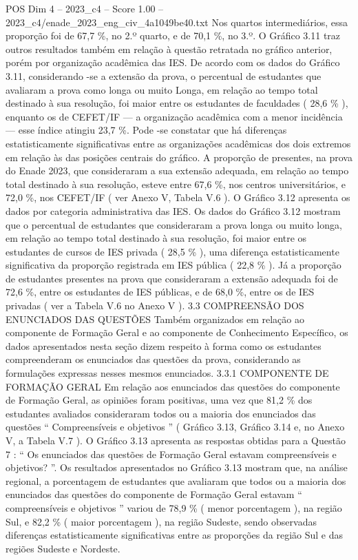 \begin{textsample}{POS Dim 4 – 2023\_c4 – Score 1.00 – 2023\_c4/enade\_2023\_eng\_civ\_4a1049be40.txt}
Nos quartos intermediários, essa proporção foi de 67,7 \%, no 2.º quarto, e de 70,1 \%, no 3.º.
O Gráfico 3.11 traz outros resultados também em relação à questão retratada no gráfico anterior, porém por organização acadêmica das IES.
De acordo com os dados do Gráfico 3.11, considerando -se a extensão da prova, o percentual de estudantes que avaliaram a prova como longa ou muito Longa, em relação ao tempo total destinado à sua resolução, foi maior entre os estudantes de faculdades ( 28,6 \% ), enquanto os de CEFET/IF — a organização acadêmica com a menor incidência — esse índice atingiu 23,7 \%.
Pode -se constatar que há diferenças estatisticamente significativas entre as organizações acadêmicas dos dois extremos em relação às das posições centrais do gráfico.
A proporção de presentes, na prova do Enade 2023, que consideraram a sua extensão adequada, em relação ao tempo total destinado à sua resolução, esteve entre 67,6 \%, nos centros universitários, e 72,0 \%, nos CEFET/IF ( ver Anexo V, Tabela V.6 ).
O Gráfico 3.12 apresenta os dados por categoria administrativa das IES.
Os dados do Gráfico 3.12 mostram que o percentual de estudantes que consideraram a prova longa ou muito longa, em relação ao tempo total destinado à sua resolução, foi maior entre os estudantes de cursos de IES privada ( 28,5 \% ), uma diferença estatisticamente significativa da proporção registrada em IES pública ( 22,8 \% ).
Já a proporção de estudantes presentes na prova que consideraram a extensão adequada foi de 72,6 \%, entre os estudantes de IES públicas, e de 68,0 \%, entre os de IES privadas ( ver a Tabela V.6 no Anexo V ). 3.3 COMPREENSÃO DOS ENUNCIADOS DAS QUESTÕES Também organizados em relação ao componente de Formação Geral e ao componente de Conhecimento Específico, os dados apresentados nesta seção dizem respeito à forma como os estudantes compreenderam os enunciados das questões da prova, considerando as formulações expressas nesses mesmos enunciados. 3.3.1 COMPONENTE DE FORMAÇÃO GERAL Em relação aos enunciados das questões do componente de Formação Geral, as opiniões foram positivas, uma vez que 81,2 \% dos estudantes avaliados consideraram todos ou a maioria dos enunciados das questões “ Compreensíveis e objetivos ” ( Gráfico 3.13, Gráfico 3.14 e, no Anexo V, a Tabela V.7 ).
O Gráfico 3.13 apresenta as respostas obtidas para a Questão 7 : “ Os enunciados das questões de Formação Geral estavam compreensíveis e objetivos? ”.
Os resultados apresentados no Gráfico 3.13 mostram que, na análise regional, a porcentagem de estudantes que avaliaram que todos ou a maioria dos enunciados das questões do componente de Formação Geral estavam “ compreensíveis e objetivos ” variou de 78,9 \% ( menor porcentagem ), na região Sul, e 82,2 \% ( maior porcentagem ), na região Sudeste, sendo observadas diferenças estatisticamente significativas entre as proporções da região Sul e das regiões Sudeste e Nordeste.

\end{textsample}
